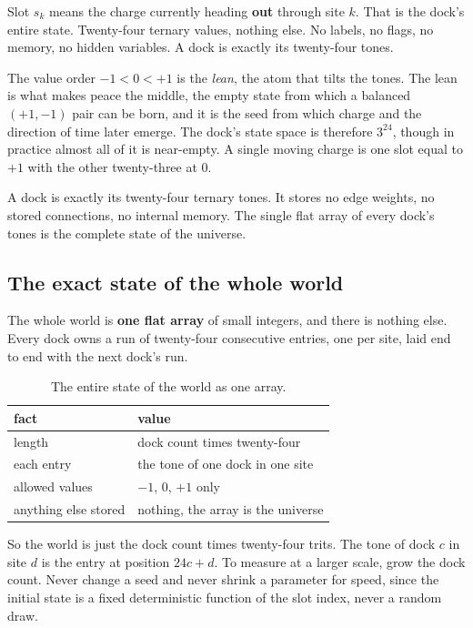 Slot $s_k$ means the charge currently heading \textbf{out} through site $k$. That is the dock's entire state. Twenty-four ternary values, nothing else. No labels, no flags, no memory, no hidden variables. A dock is exactly its twenty-four tones.

The value order $-1 < 0 < +1$ is the \emph{lean}, the atom that tilts the tones. The lean is what makes peace the middle, the empty state from which a balanced $(+1, -1)$ pair can be born, and it is the seed from which charge and the direction of time later emerge. The dock's state space is therefore $3^{24}$, though in practice almost all of it is near-empty. A single moving charge is one slot equal to $+1$ with the other twenty-three at $0$.

\begin{principle}
A dock is exactly its twenty-four ternary tones. It stores no edge weights, no stored connections, no internal memory. The single flat array of every dock's tones is the complete state of the universe.
\end{principle}

\subsection{The exact state of the whole world}

The whole world is \textbf{one flat array} of small integers, and there is nothing else. Every dock owns a run of twenty-four consecutive entries, one per site, laid end to end with the next dock's run.

\begin{table}[ht]
\centering
\begin{tabular}{@{}ll@{}}
\toprule
fact & value \\
\midrule
length & dock count times twenty-four \\
each entry & the tone of one dock in one site \\
allowed values & $-1$, $0$, $+1$ only \\
anything else stored & nothing, the array is the universe \\
\bottomrule
\end{tabular}
\caption{The entire state of the world as one array.}
\label{tab:the-world-array}
\end{table}

So the world is just the dock count times twenty-four trits. The tone of dock $c$ in site $d$ is the entry at position $24c + d$. To measure at a larger scale, grow the dock count. Never change a seed and never shrink a parameter for speed, since the initial state is a fixed deterministic function of the slot index, never a random draw.

